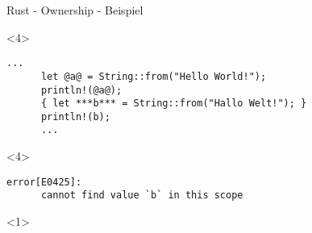 \begin{frame}[fragile]{Rust - Ownership - Beispiel}

  \begin{onlyenv}<4> {
    \begin{lstlisting}[frame=single,style=base]
      ...
      let @a@ = String::from("Hello World!");
      println!(@a@);
      { let ***b*** = String::from("Hallo Welt!"); }
      println!(b);
      ...
    \end{lstlisting}
  }
  \end{onlyenv}

  \begin{onlyenv}<4> {
    \begin{lstlisting}[frame=single,style=base]
      error[E0425]:
      cannot find value `b` in this scope
    \end{lstlisting}
  }
  \end{onlyenv}


  \begin{onlyenv}<1> {
    \begin{lstlisting}[frame=single,style=base]


    \end{lstlisting}
  }
  \end{onlyenv}

\end{frame}